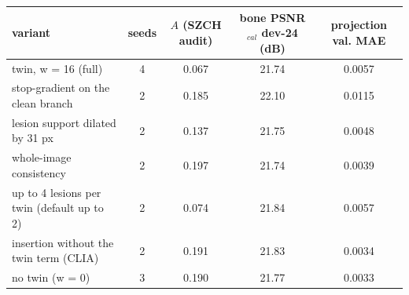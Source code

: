 \begin{tabular}{lcccc}
\toprule
variant & seeds & $A$ (SZCH audit) & bone PSNR$_{cal}$ dev-24 (dB) & projection val. MAE \\
\midrule
twin, w = 16 (full) & 4 & 0.067 & 21.74 & 0.0057 \\
stop-gradient on the clean branch & 2 & 0.185 & 22.10 & 0.0115 \\
lesion support dilated by 31 px & 2 & 0.137 & 21.75 & 0.0048 \\
whole-image consistency & 2 & 0.197 & 21.74 & 0.0039 \\
up to 4 lesions per twin (default up to 2) & 2 & 0.074 & 21.84 & 0.0057 \\
insertion without the twin term (CLIA) & 2 & 0.191 & 21.83 & 0.0034 \\
no twin (w = 0) & 3 & 0.190 & 21.77 & 0.0033 \\
\bottomrule
\end{tabular}
